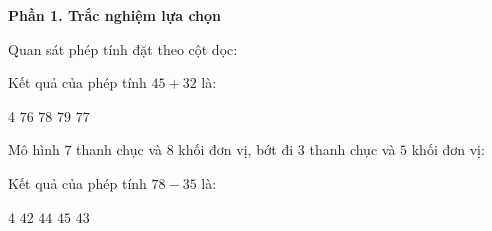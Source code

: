 \providecommand{\VeXePhepTinhLT}[4]{%
  \begin{scope}[shift={(#1)}, scale=0.55]
    \draw[fill=#2!35, draw=black!80, line width=0.7pt, rounded corners=3pt] (-1.6,0) rectangle (1.6,0.85);
    \draw[fill=white, draw=black!70, line width=0.5pt, rounded corners=2pt] (-1.4,0.12) rectangle (1.4,0.72);
    \node[font=\bfseries\small, color=blue!90!black] at (0,0.42) {#3 = #4};
    \fill[black!85] (-1.0,-0.12) circle (0.18cm);
    \fill[gray!40] (-1.0,-0.12) circle (0.08cm);
    \fill[black!85] (1.0,-0.12) circle (0.18cm);
    \fill[gray!40] (1.0,-0.12) circle (0.08cm);
  \end{scope}
}


\textbf{Phần 1. Trắc nghiệm lựa chọn}


\begin{ex} %
Quan sát phép tính đặt theo cột dọc:
\begin{center}\vspace{-2.5mm}
\vspace{-2.5mm}\end{center}
Kết quả của phép tính $45 + 32$ là:
\begin{multicols}{4}
\choice
{$76$}
{$78$}
{$79$}
{\True $77$}
\end{multicols}
\end{ex}

\begin{ex} %
Mô hình $7$ thanh chục và $8$ khối đơn vị, bớt đi $3$ thanh chục và $5$ khối đơn vị:
\begin{center}\vspace{-2.5mm}
\vspace{-2.5mm}\end{center}
Kết quả của phép tính $78 - 35$ là:
\begin{multicols}{4}
\choice
{$42$}
{$44$}
{$45$}
{\True $43$}
\end{multicols}
\end{ex}

